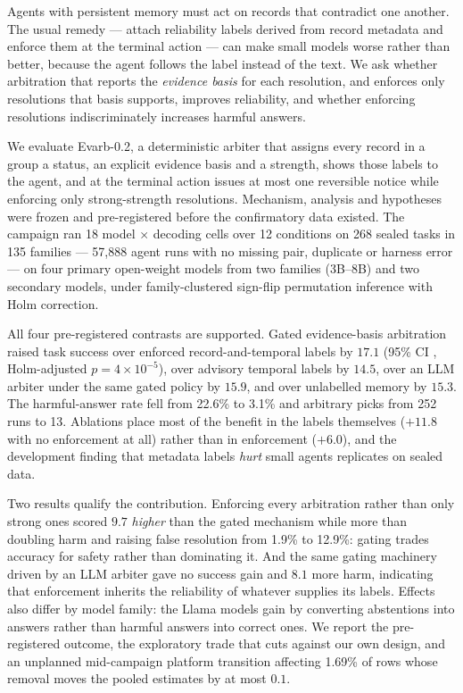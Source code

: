 Agents with persistent memory must act on records that contradict one another. The usual remedy --- attach
reliability labels derived from record metadata and enforce them at the terminal action --- can make small models
worse rather than better, because the agent follows the label instead of the text. We ask whether arbitration that
reports the \emph{evidence basis} for each resolution, and enforces only resolutions that basis supports, improves
reliability, and whether enforcing resolutions indiscriminately increases harmful answers.

We evaluate Evarb-0.2, a deterministic arbiter that assigns every record in a group a status, an explicit evidence
basis and a strength, shows those labels to the agent, and at the terminal action issues at most one reversible
notice while enforcing only strong-strength resolutions. Mechanism, analysis and hypotheses were frozen and
pre-registered before the confirmatory data existed. The campaign ran 18 model $\times$ decoding cells over 12
conditions on 268 sealed tasks in 135 families --- 57{,}888 agent runs with no missing pair, duplicate or harness
error --- on four primary open-weight models from two families (3B--8B) and two secondary models, under
family-clustered sign-flip permutation inference with Holm correction.

All four pre-registered contrasts are supported. Gated evidence-basis arbitration raised task success over enforced
record-and-temporal labels by $17.1$\pp{} (95\% CI , Holm-adjusted $p=4\times10^{-5}$), over advisory
temporal labels by $14.5$\pp, over an LLM arbiter under the same gated policy by $15.9$\pp, and over unlabelled
memory by $15.3$\pp. The harmful-answer rate fell from 22.6\% to 3.1\% and arbitrary picks from 252 runs to 13.
Ablations place most of the benefit in the labels themselves ($+11.8$\pp{} with no enforcement at all) rather than
in enforcement ($+6.0$\pp), and the development finding that metadata labels \emph{hurt} small agents replicates on
sealed data.

Two results qualify the contribution. Enforcing every arbitration rather than only strong ones scored $9.7$\pp{}
\emph{higher} than the gated mechanism while more than doubling harm and raising false resolution from 1.9\% to
12.9\%: gating trades accuracy for safety rather than dominating it. And the same gating machinery driven by an LLM
arbiter gave no success gain and $8.1$\pp{} more harm, indicating that enforcement inherits the reliability of
whatever supplies its labels. Effects also differ by model family: the Llama models gain by converting abstentions
into answers rather than harmful answers into correct ones. We report the pre-registered outcome, the exploratory
trade that cuts against our own design, and an unplanned mid-campaign platform transition affecting 1.69\% of rows
whose removal moves the pooled estimates by at most $0.1$\pp.
